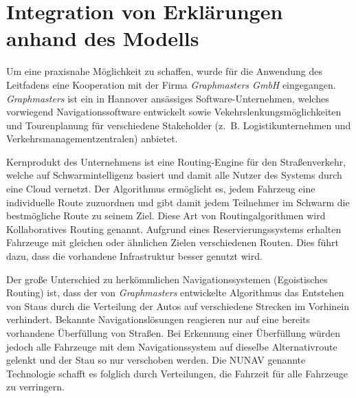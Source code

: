 \section{Integration von Erklärungen anhand des Modells}

Um eine praxisnahe Möglichkeit zu schaffen, wurde für die Anwendung des Leitfadens eine Kooperation mit der Firma \textit{Graphmasters GmbH} eingegangen. \textit{Graphmasters} ist ein in Hannover ansässiges Software-Unternehmen, welches vorwiegend Navigationssoftware entwickelt sowie Vekehrslenkungsmöglichkeiten und Tourenplanung für verschiedene Stakeholder (z.~B. Logistikunternehmen und Verkehrsmanagementzentralen) anbietet. 

Kernprodukt des Unternehmens ist eine Routing-Engine für den Straßenverkehr, welche auf Schwarmintelligenz basiert und damit alle Nutzer des Systems durch eine Cloud vernetzt. Der Algorithmus ermöglicht es, jedem Fahrzeug eine individuelle Route zuzuordnen und gibt damit jedem Teilnehmer im Schwarm die bestmögliche Route zu seinem Ziel. Diese Art von Routingalgorithmen wird \glqq Kollaboratives Routing\grqq{} genannt. Aufgrund eines Reservierungssystems erhalten Fahrzeuge mit gleichen oder ähnlichen Zielen verschiedenen Routen. Dies führt dazu, dass die vorhandene Infrastruktur besser genutzt wird.

Der große Unterschied zu herkömmlichen Navigationssystemen (\glqq Egoistisches Routing\grqq{}) ist, dass der von \textit{Graphmasters} entwickelte Algorithmus das Entstehen von Staus durch die Verteilung der Autos auf verschiedene Strecken im Vorhinein verhindert. Bekannte Navigationslösungen reagieren nur auf eine bereits vorhandene Überfüllung von Straßen. Bei Erkennung einer Überfüllung würden jedoch alle Fahrzeuge mit dem Navigationssystem auf dieselbe Alternativroute gelenkt und der Stau so nur verschoben werden. Die NUNAV genannte Technologie schafft es folglich durch Verteilungen, die Fahrzeit für alle Fahrzeuge zu verringern.











